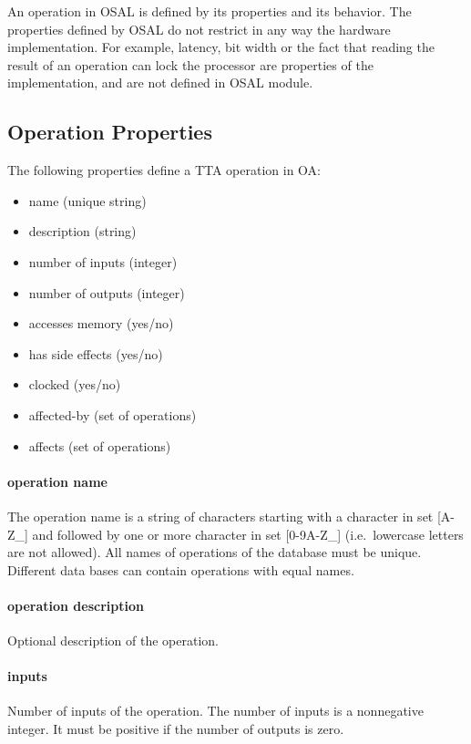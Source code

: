\documentclass[a4paper,twoside]{tceusermanual}
\begin{document}
An operation in OSAL is defined by its properties
and its behavior.  The properties defined by OSAL do not restrict in any
way the hardware implementation.  For example, latency, bit width or the
fact that reading the result of an operation can lock the processor are
properties of the implementation, and are not defined in OSAL module.

\subsection{Operation Properties}
\label{ssec:operation-properties}

The following properties define a TTA operation in OA:

\begin{itemize}
\item name (unique string)
\item description (string)
\item number of inputs (integer)
\item number of outputs (integer)
\item accesses memory (yes/no)
\item has side effects (yes/no)
\item clocked (yes/no)
\item affected-by (set of operations)
\item affects (set of operations)
\end{itemize}

\paragraph{operation name}
The operation name is a string of characters starting with a character in
set [A-Z\_] and followed by one or more character in set [0-9A-Z\_] 
(i.e.\ lowercase letters are not allowed).  All
names of operations of the database must be unique. Different data bases 
can contain operations with equal names. 

\paragraph{operation description}
Optional description of the operation.

\paragraph{inputs}
Number of inputs of the operation. The number of inputs is a
nonnegative integer. It must be positive if the number of outputs is
zero.
\end{document}
